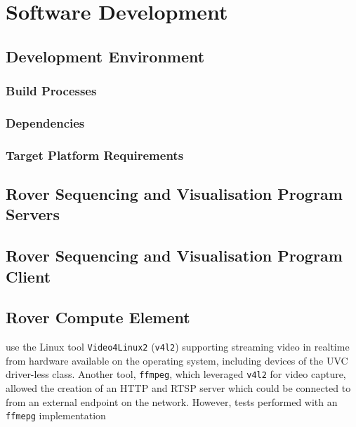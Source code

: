 \section{Software Development}
\label{sec:softwareDevelopment}
  \subsection{Development Environment}
    \subsubsection{Build Processes}
    \subsubsection{Dependencies}
    \subsubsection{Target Platform Requirements} 
    
  \subsection{Rover Sequencing and Visualisation Program Servers}
  \subsection{Rover Sequencing and Visualisation Program Client}
  \subsection{Rover Compute Element}
  
  
  
  use the Linux tool \texttt{Video4Linux2} (\texttt{v4l2}) supporting streaming video in realtime from hardware available on the operating system, including devices of the UVC driver-less class. Another tool, \texttt{ffmpeg}, which leveraged \texttt{v4l2} for video capture, allowed the creation of an HTTP and RTSP server which could be connected to from an external endpoint on the network. However, tests performed with an \texttt{ffmepg} implementation